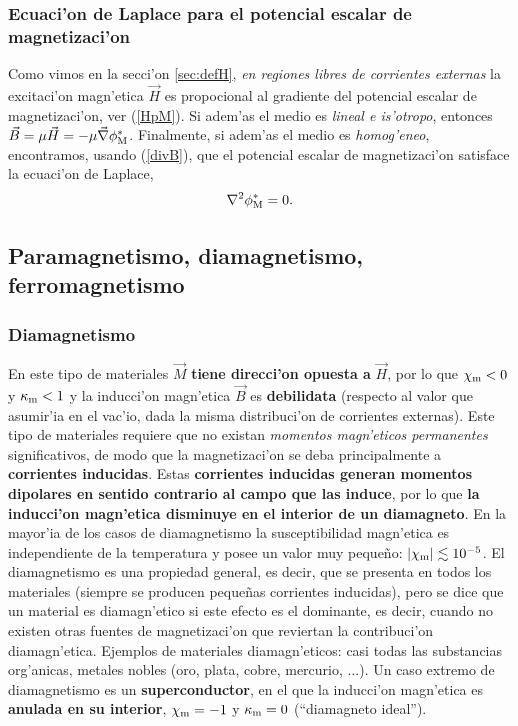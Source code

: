 \subsubsection{Ecuaci'on de Laplace para el potencial escalar de magnetizaci'on}
Como vimos en la secci'on \ref{sec:defH}, \textit{en regiones libres de corrientes externas} la excitaci'on magn'etica $\vec{H}$ es propocional al gradiente del potencial escalar de magnetizaci'on, ver (\ref{HpM}). Si adem'as el medio es \textit{lineal e is'otropo}, entonces $\vec{B}=\mu\vec{H}=-\mu\vec{\nabla}\phi^\ast_{\rm M}$. Finalmente, si adem'as el medio es \textit{homog'eneo}, encontramos, usando (\ref{divB}), que el potencial escalar de magnetizaci'on satisface la ecuaci'on de Laplace,
\begin{equation}
\nabla^2\phi^\ast_{\rm M}=0.
\end{equation}


\subsection{Paramagnetismo, diamagnetismo, ferromagnetismo}

\subsubsection{Diamagnetismo}
En este tipo de materiales $\vec{M}$ \textbf{tiene direcci'on opuesta a}  $\vec{H}$, por lo que $\chi_{\rm m}<0$ y $\kappa_{\rm m}<1$ y la inducci'on magn'etica $\vec{B}$ es \textbf{debilidata} (respecto al valor que asumir'ia en el vac'io, dada la misma distribuci'on de corrientes externas). Este tipo de materiales requiere que no existan \textit{momentos magn'eticos permanentes} significativos, de modo que la magnetizaci'on se deba principalmente a \textbf{corrientes inducidas}. Estas \textbf{corrientes inducidas generan momentos dipolares en sentido contrario al campo que las induce}, por lo que \textbf{la inducci'on magn'etica disminuye en el interior de un diamagneto}. En la mayor'ia de los casos de diamagnetismo la susceptibilidad magn'etica es independiente de la
temperatura y posee un valor muy peque\~no: $|\chi_{\rm m}|\lesssim 10^{-5}$. El
diamagnetismo es una propiedad general, es decir, que se presenta en todos los
materiales (siempre se producen peque\~nas corrientes inducidas), pero se dice
que un material es diamagn'etico si este efecto es el dominante, es decir,
cuando no existen otras fuentes de magnetizaci'on que reviertan la contribuci'on diamagn'etica.
Ejemplos de materiales diamagn'eticos: casi todas las substancias org'anicas,
metales nobles (oro, plata, cobre, mercurio, ...). Un caso extremo de
diamagnetismo es un \textbf{superconductor}, en el que la inducci'on magn'etica
es \textbf{anulada en su interior}, $\chi_{\rm m}=-1$ y $\kappa_{\rm m}=0$ (``diamagneto ideal'').

